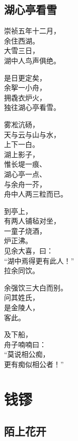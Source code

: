 \documentclass[
]{book}
\renewenvironment{quote}{\begin{VF}}{\end{VF}}
\begin{document}
\hypertarget{section-9}{%
\section{湖心亭看雪}\label{section-9}}

\begin{quote}
崇祯五年十二月，\\
余住西湖。\\
大雪三日，\\
湖中人鸟声俱绝。

是日更定矣，\\
余挐一小舟，\\
拥毳衣炉火，\\
独往湖心亭看雪。

雾凇沆砀，\\
天与云与山与水，\\
上下一白。\\
湖上影子，\\
惟长堤一痕、\\
湖心亭一点、\\
与余舟一芥，\\
舟中人两三粒而已。

到亭上，\\
有两人铺毡对坐，\\
一童子烧酒，\\
炉正沸。\\
见余大喜，曰：\\
``湖中焉得更有此人！''\\
拉余同饮。

余强饮三大白而别。\\
问其姓氏，\\
是金陵人，\\
客此。

及下船，\\
舟子喃喃曰：\\
``莫说相公痴，\\
更有痴似相公者！''
\end{quote}

\hypertarget{section-10}{%
\chapter{钱镠}\label{section-10}}

\hypertarget{section-11}{%
\section{陌上花开}\label{section-11}}
\end{document}
